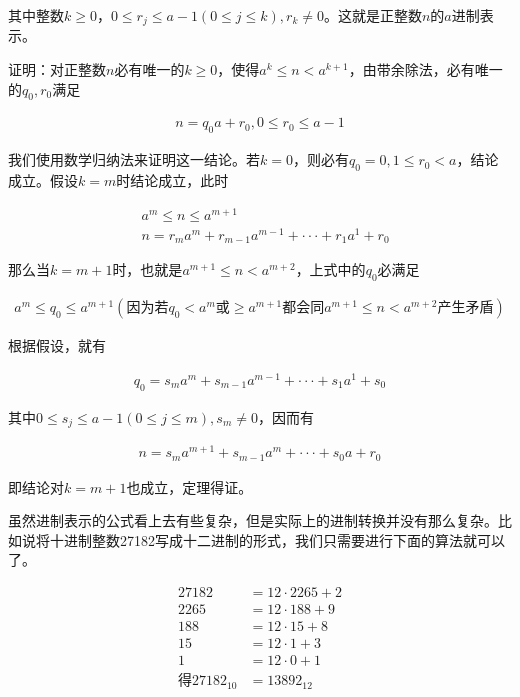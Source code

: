 \documentclass[12pt, a4paper, oneside]{ctexart}
\begin{document}
其中整数$k\geqslant0$，$0\leqslant r_j\leqslant a-1(0\leqslant j\leqslant k),r_k\neq0$。这就是正整数$n$的$a$进制表示。

证明：对正整数$n$必有唯一的$k\geqslant0$，使得$a^k\leqslant n<a^{k+1}$，由带余除法，必有唯一的$q_0,r_0$满足

$$\begin{align*}
n=q_0a+r_0,0\leqslant r_0\leqslant a-1
\end{align*}$$

我们使用数学归纳法来证明这一结论。若$k=0$，则必有$q_0=0,1\leqslant r_0<a$，结论成立。假设$k=m$时结论成立，此时

$$\begin{align*}
&a^m\leqslant n\leq a^{m+1}\\
&n=r_ma^m+r_{m-1}a^{m-1}+\cdot\cdot\cdot+r_1a^1+r_0  
\end{align*}$$

那么当$k=m+1$时，也就是$a^{m+1}\leqslant n<a^{m+2}$，上式中的$q_0$必满足

$$\begin{align*}
a^m\leqslant q_0\leq a^{m+1}(因为若q_0<a^m或\geqslant a^{m+1}都会同a^{m+1}\leqslant n<a^{m+2}产生矛盾)
\end{align*}$$

根据假设，就有

$$\begin{align*}
q_0=s_ma^m+s_{m-1}a^{m-1}+\cdot\cdot\cdot+s_1a^1+s_0  
\end{align*}$$

其中$0\leqslant s_j\leqslant a-1(0\leqslant j\leqslant m),s_m\neq0$，因而有

$$\begin{align*}
n=s_ma^{m+1}+s_{m-1}a^{m}+\cdot\cdot\cdot+s_0a+r_0
\end{align*}$$

即结论对$k=m+1$也成立，定理得证。

虽然进制表示的公式看上去有些复杂，但是实际上的进制转换并没有那么复杂。比如说将十进制整数27182写成十二进制的形式，我们只需要进行下面的算法就可以了。

$$\begin{align*}
27182&=12\cdot2265+2\\
2265&=12\cdot188+9\\
188&=12\cdot15+8\\
15&=12\cdot1+3\\
1&=12\cdot0+1\\
得27182_{10}&=13892_{12}
\end{align*}$$
\end{document}

